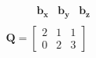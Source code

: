 \documentclass[preview]{standalone}
\begin{document}
\begin{align*}
\begin{array}{ccc}\begin{matrix}\hspace{1cm} \mathbf{b_{x}}  & \mathbf{b_{y}} & \mathbf{b_{z}} \end{matrix} \\ \mathbf{Q} = \begin{bmatrix} 2 & 1 & 1 \\ 0 & 2 & 3 \end{bmatrix} \end{array}
\end{align*}
\end{document}
